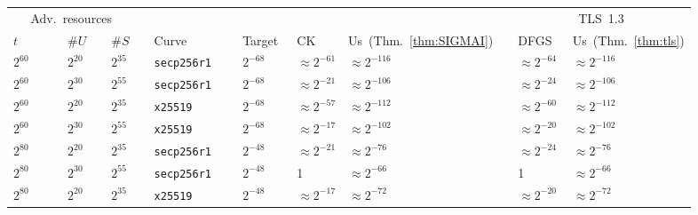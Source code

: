 \begin{table}[t]
	\centering
	\small
	
	\renewcommand{\arraystretch}{0.001}
	\renewcommand{\tabcolsep}{0.05cm}
	\begin{tabular}{@{}lllllllllll@{}}
	\toprule
	\multicolumn{3}{c}{Adv.\ resources}		&&&		& \multicolumn{2}{c}{\SIGMA}	& \hspace{0.2cm} & \multicolumn{2}{c}{TLS~1.3} \\
	\cmidrule{1-3} \cmidrule{7-8} \cmidrule{10-11}
	$t$~~~~~~	& $\#U$~~	& $\#S$ && Curve~~~~~~~	& Target~	& CK\,{\scriptsize\cite{C:CanKra02}}~	& Us~{\scriptsize(Thm.~\ref{thm:SIGMAI})}	&& DFGS\,{\scriptsize\cite{JC:DFGS21}}~	& Us~{\scriptsize(Thm.~\ref{thm:tls})} \\
	\midrule
$2^{60}$	&$2^{20}$	&$2^{35}$	&&\texttt{secp256r1} 	&$2^{-68}$	&\cellcolor{red!25}$\approx 2^{-61}$	&$\approx 2^{-116}$	&& \cellcolor{red!25}$\approx 2^{-64}$	&$\approx 2^{-116}$	 \\
$2^{60}$	&$2^{30}$	&$2^{55}$	&&\texttt{secp256r1}	&$2^{-68}$	&\cellcolor{red!25}$\approx 2^{-21}$	&$\approx 2^{-106}$	&& \cellcolor{red!25}$\approx 2^{-24}$	&$\approx 2^{-106}$	 \\
\midrule
$2^{60}$	&$2^{20}$	&$2^{35}$	&&\texttt{x25519}	&$2^{-68}$	&\cellcolor{red!25}$\approx 2^{-57}$	&$\approx 2^{-112}$	&& \cellcolor{red!25}$\approx 2^{-60}$	&$\approx 2^{-112}$	 \\
$2^{60}$	&$2^{30}$	&$2^{55}$	&&\texttt{x25519}	&$2^{-68}$	&\cellcolor{red!25}$\approx 2^{-17}$	&$\approx 2^{-102}$	&& \cellcolor{red!25}$\approx 2^{-20}$	&$\approx 2^{-102}$	 \\
\midrule
\midrule
$2^{80}$	&$2^{20}$	&$2^{35}$	&&\texttt{secp256r1}	&$2^{-48}$	&\cellcolor{red!25}$\approx 2^{-21}$	&$\approx 2^{-76}$	&& \cellcolor{red!25}$\approx 2^{-24}$	&$\approx 2^{-76}$	 \\
$2^{80}$	&$2^{30}$	&$2^{55}$	&&\texttt{secp256r1}	&$2^{-48}$	&\cellcolor{red!25}1			&$\approx 2^{-66}$	&& \cellcolor{red!25}1			&$\approx 2^{-66}$	 \\
\midrule
$2^{80}$	&$2^{20}$	&$2^{35}$	&&\texttt{x25519}	&$2^{-48}$	&\cellcolor{red!25}$\approx 2^{-17}$	&$\approx 2^{-72}$	&& \cellcolor{red!25}$\approx 2^{-20}$	&$\approx 2^{-72}$	 \\

\end{tabular}
\end{table}
